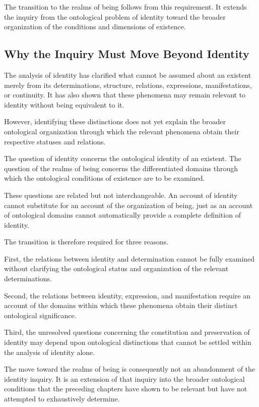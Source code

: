 The transition to the realms of being follows from this
requirement. It extends the inquiry from the ontological
problem of identity toward the broader organization of
the conditions and dimensions of existence.


\subsection{Why the Inquiry Must Move Beyond Identity}

The analysis of identity has clarified what cannot be
assumed about an existent merely from its determinations,
structure, relations, expressions, manifestations, or
continuity. It has also shown that these phenomena may
remain relevant to identity without being equivalent to it.

However, identifying these distinctions does not yet
explain the broader ontological organization through
which the relevant phenomena obtain their respective
statuses and relations.

The question of identity concerns the ontological identity
of an existent. The question of the realms of being concerns
the differentiated domains through which the ontological
conditions of existence are to be examined.

These questions are related but not interchangeable.
An account of identity cannot substitute for an account
of the organization of being, just as an account of
ontological domains cannot automatically provide a
complete definition of identity.

The transition is therefore required for three reasons.

First, the relations between identity and determination
cannot be fully examined without clarifying the
ontological status and organization of the relevant
determinations.

Second, the relations between identity, expression,
and manifestation require an account of the domains
within which these phenomena obtain their distinct
ontological significance.

Third, the unresolved questions concerning the
constitution and preservation of identity may depend
upon ontological distinctions that cannot be settled
within the analysis of identity alone.

The move toward the realms of being is consequently
not an abandonment of the identity inquiry. It is
an extension of that inquiry into the broader
ontological conditions that the preceding chapters
have shown to be relevant but have not attempted
to exhaustively determine.

